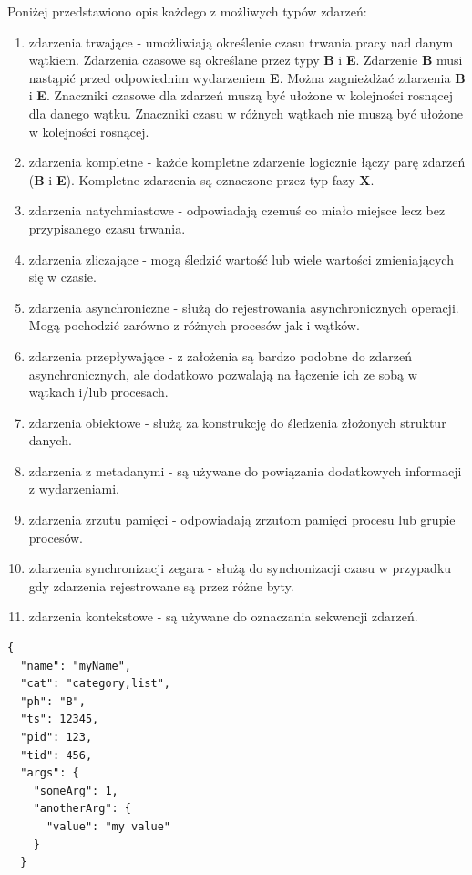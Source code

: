 \documentclass[polish, twoside, 12pt]{mwart}
\begin{document}
Poniżej przedstawiono opis każdego z możliwych typów zdarzeń:

\begin{enumerate}
  \item zdarzenia trwające - umożliwiają określenie czasu trwania pracy nad danym wątkiem. Zdarzenia czasowe są określane przez typy \textbf{B} i \textbf{E}. Zdarzenie \textbf{B} musi nastąpić przed odpowiednim wydarzeniem \textbf{E}. Można zagnieżdżać zdarzenia \textbf{B} i \textbf{E}. Znaczniki czasowe dla zdarzeń muszą być ułożone w kolejności rosnącej dla danego wątku. Znaczniki czasu w różnych wątkach nie muszą być ułożone w kolejności rosnącej.
  \item zdarzenia kompletne - każde kompletne zdarzenie logicznie łączy parę zdarzeń (\textbf{B} i \textbf{E}). Kompletne zdarzenia są oznaczone przez typ fazy \textbf{X}.
  \item zdarzenia natychmiastowe - odpowiadają czemuś co miało miejsce lecz bez przypisanego czasu trwania.
  \item zdarzenia zliczające - mogą śledzić wartość lub wiele wartości zmieniających się w czasie.
  \item zdarzenia asynchroniczne - służą do rejestrowania asynchronicznych operacji. Mogą pochodzić zarówno z różnych procesów jak i wątków.
  \item zdarzenia przepływające - z założenia są bardzo podobne do zdarzeń asynchronicznych, ale dodatkowo pozwalają na łączenie ich ze sobą w wątkach i/lub procesach.
  \item zdarzenia obiektowe - służą za konstrukcję do śledzenia złożonych struktur danych.
  \item zdarzenia z metadanymi - są używane do powiązania dodatkowych informacji z wydarzeniami.
  \item zdarzenia zrzutu pamięci - odpowiadają zrzutom pamięci procesu lub grupie procesów.
  \item zdarzenia synchronizacji zegara - służą do synchonizacji czasu w przypadku gdy zdarzenia rejestrowane są przez różne byty.
  \item zdarzenia kontekstowe - są używane do oznaczania sekwencji zdarzeń.
\end{enumerate}

\begin{lstlisting}[caption=Przykładowe zdarzenie, label={lst:example-event}]
{
  "name": "myName",
  "cat": "category,list",
  "ph": "B",
  "ts": 12345,
  "pid": 123,
  "tid": 456,
  "args": {
    "someArg": 1,
    "anotherArg": {
      "value": "my value"
    }
  }
\end{lstlisting}
\end{document}
